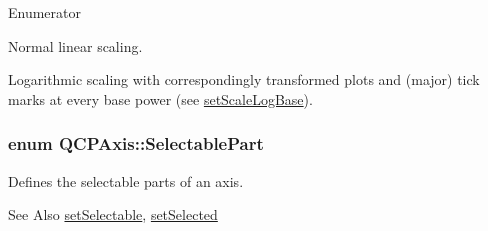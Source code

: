 \begin{Desc}
\item[Enumerator]\par
\begin{description}
\item[{\em 
\hypertarget{classQCPAxis_a36d8e8658dbaa179bf2aeb973db2d6f0aff6e30a11a828bc850caffab0ff994f6}{st\-Linear}\label{classQCPAxis_a36d8e8658dbaa179bf2aeb973db2d6f0aff6e30a11a828bc850caffab0ff994f6}
}]Normal linear scaling. \item[{\em 
\hypertarget{classQCPAxis_a36d8e8658dbaa179bf2aeb973db2d6f0abf5b785ad976618816dc6f79b73216d4}{st\-Logarithmic}\label{classQCPAxis_a36d8e8658dbaa179bf2aeb973db2d6f0abf5b785ad976618816dc6f79b73216d4}
}]Logarithmic scaling with correspondingly transformed plots and (major) tick marks at every base power (see \hyperlink{classQCPAxis_a726186054be90487885a748aa1b42188}{set\-Scale\-Log\-Base}). \end{description}
\end{Desc}
\hypertarget{classQCPAxis_abee4c7a54c468b1385dfce2c898b115f}{
\subsubsection[{Selectable\-Part}]{\setlength{\rightskip}{0pt plus 5cm}enum {\bf Q\-C\-P\-Axis\-::\-Selectable\-Part}}}\label{classQCPAxis_abee4c7a54c468b1385dfce2c898b115f}
Defines the selectable parts of an axis. \begin{DoxySeeAlso}{See Also}
\hyperlink{classQCPAxis_afa988209bf6519f63d6ef2e615dbe1ea}{set\-Selectable}, \hyperlink{classQCPAxis_a24c13908da2f8d629b1bbbe9cbd63e39}{set\-Selected} 
\end{DoxySeeAlso}
